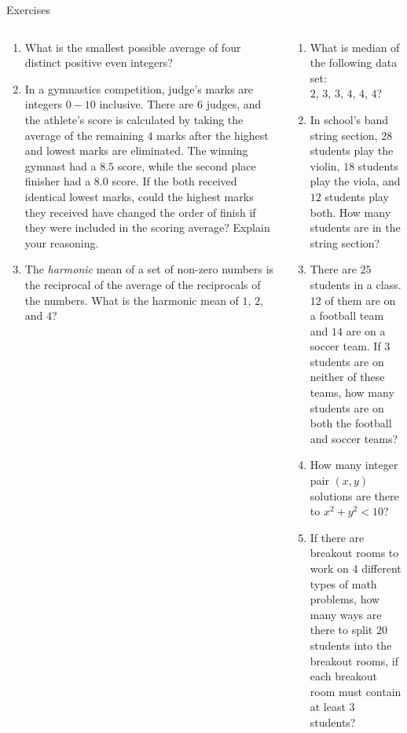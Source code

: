 \documentclass[9pt,aspectratio=169]{beamer}
\begin{document}
\begin{frame}{Exercises}
  \begin{columns}[T]
    \begin{column}{0.5\textwidth}
      \begin{enumerate}
        \item What is the smallest possible average of four distinct positive even integers?
        \item In a gymnastics competition, judge’s marks are integers $0-10$ inclusive.  There are $6$ judges, and the athlete's score is calculated by taking the average of the remaining $4$ marks after the highest and lowest marks are eliminated.  The winning gymnast had a $8.5$ score, while the second place finisher had a $8.0$ score.  If the both received identical lowest marks, could the highest marks they received have changed the order of finish if they were included in the scoring average?  Explain your reasoning.
        \item The \emph{harmonic} mean of a set of non-zero numbers is the reciprocal of the average of the reciprocals of the numbers. 
        What is the harmonic mean of $1$, $2$, and $4$?
        \seti
      \end{enumerate}
    \end{column}
    \begin{column}{0.5\textwidth}
      \begin{enumerate}
        \conti
        \item What is median of the following data set:\\ $2$, $3$, $3$, $4$, $4$, $4$?
        \item In school's band string section, $28$ students play the violin, $18$ students play the viola, and $12$ students play both.  How many students are in the string section?
        \item There are $25$ students in a class. $12$ of them are on a football team and $14$ are on a soccer team. If $3$ students are on neither of these teams, how many students are on both the football and soccer teams?
        \item How many integer pair $(x, y)$ solutions are there to $x^2 + y^2 < 10$?
        \item If there are breakout rooms to work on $4$ different types of math problems, how many ways are there to split $20$ students into the breakout rooms, if each breakout room must contain at least $3$ students?
      \end{enumerate}
    \end{column}
  \end{columns}
\end{frame}
\end{document}
